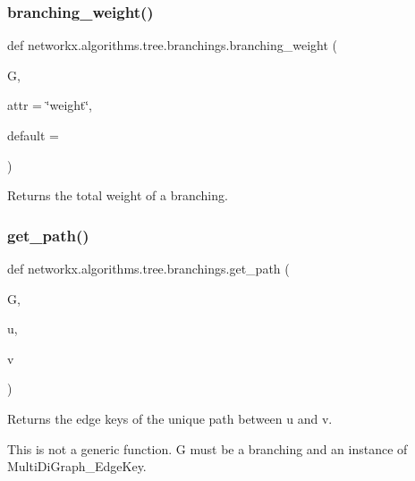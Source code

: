 \subsubsection{\texorpdfstring{branching\+\_\+weight()}{branching\_weight()}}
{\footnotesize\ttfamily def networkx.\+algorithms.\+tree.\+branchings.\+branching\+\_\+weight (\begin{DoxyParamCaption}\item[{}]{G,  }\item[{}]{attr = {\ttfamily \char`\"{}weight\char`\"{}},  }\item[{}]{default = {} }\end{DoxyParamCaption})}

\begin{DoxyVerb}Returns the total weight of a branching.\end{DoxyVerb}
 \mbox{\label{namespacenetworkx_1_1algorithms_1_1tree_1_1branchings_a344967dc01dab415c2bdbd9220177b1d}} 
\subsubsection{\texorpdfstring{get\+\_\+path()}{get\_path()}}
{\footnotesize\ttfamily def networkx.\+algorithms.\+tree.\+branchings.\+get\+\_\+path (\begin{DoxyParamCaption}\item[{}]{G,  }\item[{}]{u,  }\item[{}]{v }\end{DoxyParamCaption})}

\begin{DoxyVerb}Returns the edge keys of the unique path between u and v.

This is not a generic function. G must be a branching and an instance of
MultiDiGraph_EdgeKey.\end{DoxyVerb}
 \mbox{\label{namespacenetworkx_1_1algorithms_1_1tree_1_1branchings_a4faacb709c09e382dc3c796e4ea2d63c}} 
